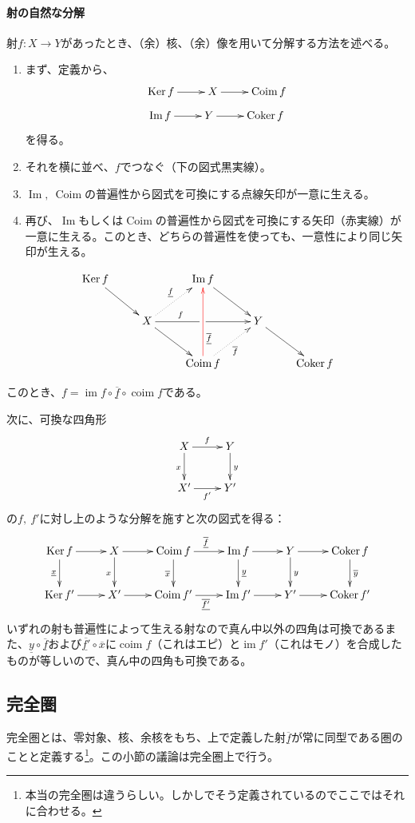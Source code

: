 \documentclass[a4paper,11pt]{jsarticle}
\theoremstyle{definition}
\DeclareMathOperator{\Ima}{\mathrm{Im}}
\DeclareMathOperator{\im}{\mathrm{im}}
\DeclareMathOperator{\Coker}{\mathrm{Coker}}
\DeclareMathOperator{\Coim}{\mathrm{Coim}}
\DeclareMathOperator{\coim}{\mathrm{coim}}
\DeclareMathOperator{\Ker}{\mathrm{Ker}}
\newcommand{\ou}[1]{\overline{\underline{#1}}}
\begin{document}
\paragraph{射の自然な分解}
射$f\colon X \to Y$があったとき、（余）核、（余）像を用いて分解する方法を述べる。
\begin{enumerate}[label=\underline{\textsf{Step \arabic*}}]
  \item まず、定義から、\[\xymatrix{
    \Ker f\ar[r]&X\ar[r]&\Coim f
  }\]\[
  \xymatrix{
    \Ima f\ar[r]&Y\ar[r]&\Coker f
  }
  \]を得る。
  \item それを横に並べ、$f$でつなぐ（下の図式黒実線）。
  \item $\Ima,\ \Coim$の普遍性から図式を可換にする点線矢印が一意に生える。
  \item 再び、$\Ima$もしくは$\Coim$の普遍性から図式を可換にする矢印（赤実線）が一意に生える。このとき、どちらの普遍性を使っても、一意性により同じ矢印が生える。
\end{enumerate}
\begin{equation}\label{diagram:coim_to_im}
  \vcenter{
  \xymatrix{
  \Ker f \ar[rd] & & \Ima f \ar[rd] & & \\
  & X \ar[rd] \ar[rr]^(.3){f}|\hole \ar@{.>}[ru]^{\underline{f}} & & Y \ar[rd] & \\
  & & \Coim f \ar@{.>}[ru]_{\overline{f}} \ar@[red][uu]_(.3){\ou{f}}& & \Coker f
}
}
\end{equation}

このとき、$f=\im f\circ \ou{f}\circ \coim f $である。

次に、可換な四角形\[\xymatrix{
  X\ar[r]^{f}\ar[d]_{x}&Y\ar[d]^{y}\\
  X'\ar[r]_{f'}&Y'
}\]の$f,\ f'$に対し上のような分解を施すと次の図式を得る：\[\xymatrix{
  \Ker f\ar[r]\ar[d]_{\underline{x}}&X\ar[r]\ar[d]_{x}&\Coim f\ar[r]^{\ou{f}}\ar[d]_{\overline{x}}&\Ima f\ar[r]\ar[d]^{\underline{y}}&Y\ar[r]\ar[d]^{y}&\Coker f\ar[d]^{\overline{y}}\\
  \Ker f'\ar[r]&X'\ar[r]&\Coim f'\ar[r]_{\ou{f'}}&\Ima f'\ar[r]&Y'\ar[r]&\Coker f'
}\]いずれの射も普遍性によって生える射なので真ん中以外の四角は可換であるまた、$\underline{y}\circ \ou{f}$および$\ou{f'}\circ \overline{x}$に$\coim f$（これはエピ）と$\im f'$（これはモノ）を合成したものが等しいので、真ん中の四角も可換である。
\subsection{完全圏}
完全圏とは、零対象、核、余核をもち、上で定義した射$\ou{f}$が常に同型である圏のことと定義する\footnote{本当の完全圏は違うらしい。しかし\cite{iversen2012cohomology}でそう定義されているのでここではそれに合わせる。}。この小節の議論は完全圏上で行う。
\end{document}
